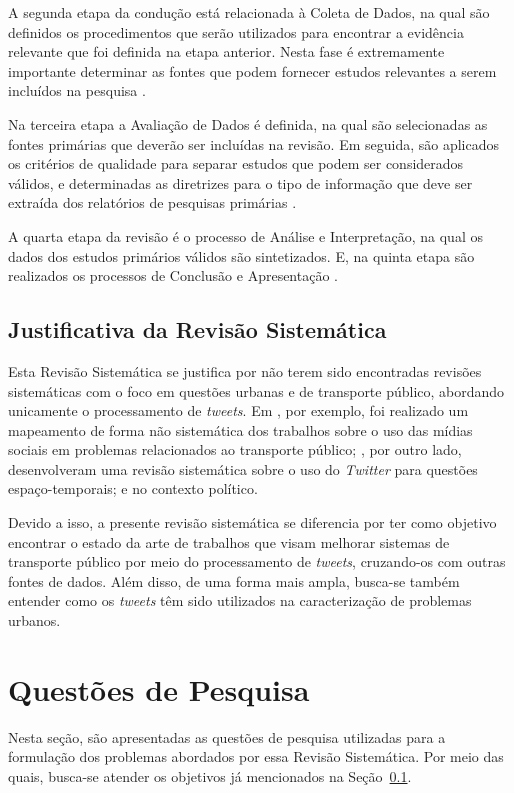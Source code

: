 \documentclass[
	12pt,				%
	oneside,			%
	a4paper,			%
	english,			%
	brazil				%
	]{abntex2ppgsi}
\begin{document}
{{{A segunda etapa da condução está relacionada à Coleta de Dados, na qual são definidos os procedimentos que serão utilizados para encontrar a evidência relevante que foi definida na etapa anterior. Nesta fase é extremamente importante determinar as fontes que podem fornecer estudos relevantes a serem incluídos na pesquisa \cite{biolchini2005techincal}.

Na terceira etapa a Avaliação de Dados é definida, na qual são selecionadas as fontes primárias que deverão ser incluídas na revisão. Em seguida,  são aplicados os critérios de qualidade para separar estudos que podem ser considerados válidos, e determinadas as diretrizes para o tipo de informação que deve ser extraída dos relatórios de pesquisas primárias \cite{biolchini2005techincal}.

A quarta etapa da revisão é o processo de Análise e Interpretação, na qual os dados dos estudos primários válidos são sintetizados. E, na quinta etapa são realizados os processos de Conclusão e Apresentação \cite{biolchini2005techincal}.

\subsection{Justificativa da Revisão Sistemática}
\label{justificativa}
Esta Revisão Sistemática se justifica por não terem sido encontradas revisões sistemáticas com o foco em questões urbanas e de transporte público, abordando unicamente o processamento de \textit{tweets}. Em \cite{Chaniotakis2016}, por exemplo, foi realizado um mapeamento de forma não sistemática dos trabalhos sobre o uso das mídias sociais em problemas relacionados ao transporte público; \cite{steiger2015advanced}, por outro lado, desenvolveram uma revisão sistemática sobre o uso do \textit{Twitter} para questões espaço-temporais; e \cite{jungherr2016twitter} no contexto político.%

Devido a isso, a presente revisão sistemática se diferencia por ter como objetivo encontrar o estado da arte de trabalhos que visam melhorar sistemas de transporte público por meio do processamento de \textit{tweets}, cruzando-os com outras fontes de dados. Além disso, de uma forma mais ampla, busca-se também entender como os \textit{tweets} têm sido utilizados na caracterização  de problemas urbanos.

\section{Questões de Pesquisa}
\label{questoes}
Nesta seção, são apresentadas as questões de pesquisa utilizadas para a formulação dos problemas abordados por essa Revisão Sistemática. Por meio das quais, busca-se atender os objetivos já mencionados na Seção~\ref{justificativa}.

}}}
\end{document}
